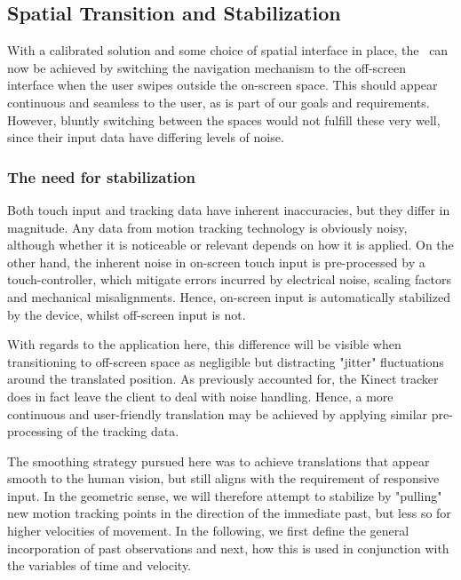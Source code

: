\subsection{Spatial Transition and Stabilization}

With a calibrated solution and some choice of spatial interface in place, the \AirSwipe\ can now be achieved by switching the navigation mechanism to the off-screen interface when the user swipes outside the on-screen space. This should appear continuous and seamless to the user, as is part of our goals and requirements. However, bluntly switching between the spaces would not fulfill these very well, since their input data have differing levels of noise.

\subsubsection{The need for stabilization}

Both touch input and tracking data have inherent inaccuracies, but they differ in magnitude. Any data from motion tracking technology is obviously noisy, although whether it is noticeable or relevant depends on how it is applied. On the other hand, the inherent noise in on-screen touch input is pre-processed by a touch-controller, which mitigate errors incurred by electrical noise, scaling factors and mechanical misalignments\cite{TouchCalibration}. Hence, on-screen input is automatically stabilized by the device, whilst off-screen input is not.

With regards to the application here, this difference will be visible when transitioning to off-screen space as negligible but distracting "jitter" fluctuations around the translated position. As previously accounted for, the Kinect tracker does in fact leave the client to deal with noise handling\cite{Kinect3DExp}. Hence, a more continuous and user-friendly translation may be achieved by applying similar pre-processing of the tracking data.


The smoothing strategy pursued here was to achieve translations that appear smooth to the human vision, but still aligns with the requirement of responsive input. In the geometric sense, we will therefore attempt to stabilize by "pulling" new motion tracking points in the direction of the immediate past, but less so for higher velocities of movement. In the following, we first define the general incorporation of past observations and next, how this is used in conjunction with the variables of time and velocity. 
